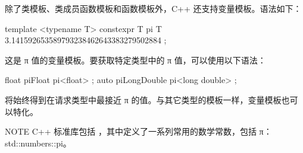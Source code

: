 
除了类模板、类成员函数模板和函数模板外，C++ 还支持变量模板。语法如下：

\begin{cpp}
template <typename T>
constexpr T pi { T { 3.141592653589793238462643383279502884 } };
\end{cpp}

这是 π 值的变量模板。要获取特定类型中的 π 值，可以使用以下语法：

\begin{cpp}
float piFloat { pi<float> };
auto piLongDouble { pi<long double> };
\end{cpp}

将始终得到在请求类型中最接近 π 的值。与其它类型的模板一样，变量模板也可以特化。

\begin{myNotic}{NOTE}
C++ 标准库包括 ，其中定义了一系列常用的数学常数，包括 π：std::numbers::pi。
\end{myNotic}














